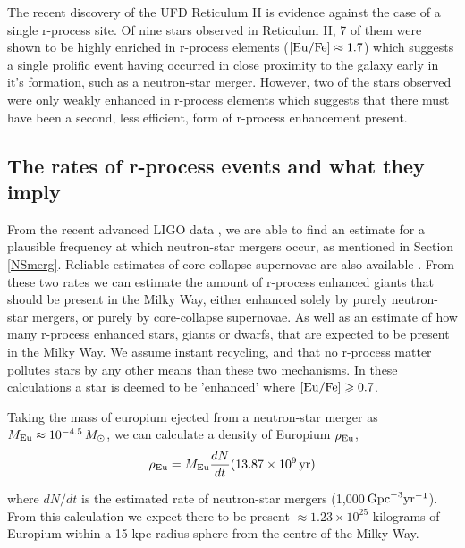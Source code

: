 \documentclass[a4paper,fleqn,usenatbib]{mnras}
\begin{document}
	The recent discovery of the UFD Reticulum II \citep{Ji2016} is evidence against the case of a single r-process site. Of nine stars observed in Reticulum II, 7 of them were shown to be highly enriched in r-process elements ($\rm{[Eu/Fe]\approx1.7}$) which suggests a single prolific event having occurred in close proximity to the galaxy early in it's formation, such as a neutron-star merger. However, two of the stars observed were only weakly enhanced in r-process elements which suggests that there must have been a second, less efficient, form of r-process enhancement present.
	
	\subsection{The rates of r-process events and what they imply}
	\label{rates}
	From the recent advanced LIGO data \citep{LIGO2016}, we are able to find an estimate for a plausible frequency at which neutron-star mergers occur, as mentioned in Section \ref{NSmerg}. Reliable estimates of core-collapse supernovae are also available \citep{Li2011}. From these two rates we can estimate the amount of r-process enhanced giants that should be present in the Milky Way, either enhanced solely by purely neutron-star mergers, or purely by core-collapse supernovae. As well as an estimate of how many r-process enhanced stars, giants or dwarfs, that are expected to be present in the Milky Way. We assume instant recycling, and that no r-process matter pollutes stars by any other means than these two mechanisms. In these calculations a star is deemed to be 'enhanced' where $[{\rm Eu/Fe}] \geq 0.7$.
	
	Taking the mass of europium ejected from a neutron-star merger as $M_{\rm Eu}\approx10^{-4.5}\,M_{\odot}$, we can calculate a density of Europium $\rho_{\rm Eu}$,
\begin{equation}
	\centering
	\rho_{\rm Eu} = M_\textrm{Eu}\frac{dN}{dt}(13.87\times10^9\,{\rm yr})
\end{equation}

\noindent{}where ${dN}/{dt}$ is the estimated rate of neutron-star mergers (1,000$\,{\rm Gpc}^{-3}{\rm yr}^{-1}$). From this calculation we expect there to be present $\approx1.23 \times 10^{25}$ kilograms of Europium within a 15 kpc radius sphere from the centre of the Milky Way.
	
\end{document}
